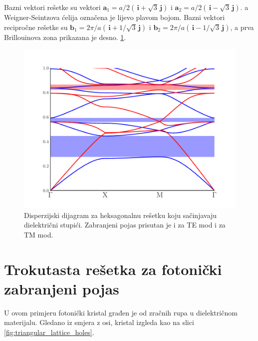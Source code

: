 \documentclass[utf8, seminar, numeric]{fer}
\begin{document}
Bazni vektori rešetke su vektori
${\mathbf{a}_1 = a/2 ( \, \mathbf{i} + \sqrt{3} \, \mathbf{j})}$ i
${\mathbf{a}_2 = a/2 ( \, \mathbf{i} - \sqrt{3} \, \mathbf{j})}$.
a Weigner-Seintzova ćelija označena je lijevo plavom bojom.
Bazni vektori recipročne rešetke su
${\mathbf{b}_1 = 2 \pi/a( \, \mathbf{i} + 1/\sqrt{3} \, \mathbf{j})}$ i
${\mathbf{b}_2 = 2 \pi/a( \, \mathbf{i} - 1/\sqrt{3} \, \mathbf{j})}$,
a prva Brillouinova zona prikazana je desno.
\ref{fig:triangular_band_diagram}.

\begin{figure}[ht]
	\centering
	\includegraphics[width = 0.8\linewidth]{./images/pdf/triangular_lattice_rods_band_diagram.pdf}
	\caption{Disperzijski dijagram za heksagonalnu rešetku koju sačinjavaju
	dielektrični stupići. Zabranjeni pojas prisutan je i za TE mod i za TM
	mod.}
	\label{fig:triangular_band_diagram}
\end{figure}

\FloatBarrier

\section {Trokutasta rešetka za fotonički zabranjeni pojas}

U ovom primjeru fotonički kristal građen je od zračnih rupa u dielektričnom
materijalu. Gledano iz smjera z osi, kristal izgleda kao na slici
\ref{fig:triangular_lattice_holes}.
\end{document}
